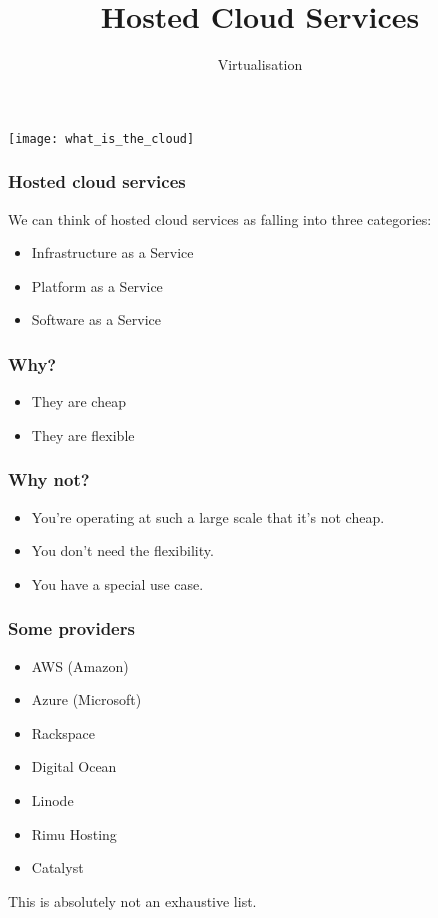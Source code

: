 \documentclass[10pt]{beamer}
\title{Hosted Cloud Services}
\author[I720]{Virtualisation}
\institute[Otago Polytechnic]{
  Otago Polytechnic \\
  Dunedin, New Zealand \\
}
\date{}
\begin{document}
\begin{frame}
  
   \begin{center}
     \texttt{[image: what\_is\_the\_cloud]}
     \end{center}
\end{frame}


\begin{frame}[plain]
  \titlepage
\end{frame}


\begin{frame}
  \frametitle{Hosted cloud services}
  
  We can think of hosted cloud services as falling into three categories:
   
   \begin{itemize}
     \item Infrastructure as a Service
     \item Platform as a Service
     \item Software as a Service
     \end{itemize}
\end{frame}
 
\begin{frame}
  \frametitle{Why?}
  
   
   \begin{itemize}
     \item They are cheap
     \item They are flexible
     \end{itemize}
\end{frame}
  
\begin{frame}
  \frametitle{Why not?}
  
   
   \begin{itemize}
     \item You're operating at such a large scale that it's not cheap.
     \item You don't need the flexibility.
     \item You have a special use case.
     \end{itemize}
\end{frame}

\begin{frame}
  \frametitle{Some providers}
  
   
   \begin{itemize}
     \item AWS (Amazon)
     \item Azure (Microsoft)
     \item Rackspace
     \item Digital Ocean
     \item Linode
     \item Rimu Hosting
     \item Catalyst
     \end{itemize}
     
     This is absolutely not an exhaustive list.
\end{frame}
\end{document}

